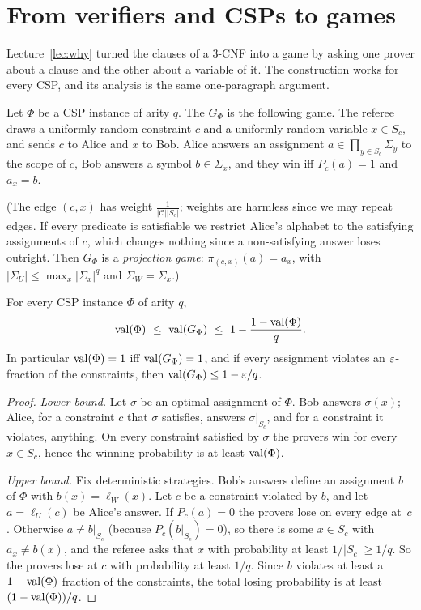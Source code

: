 \section{From verifiers and CSPs to games}
\label{sec:cv}

Lecture~\ref{lec:why} turned the clauses of a $3$-CNF into a game by asking one prover about a clause and the other
about a variable of it.  The construction works for every CSP, and its analysis is the same one-paragraph argument.

\begin{definition}\label{def:cvgame}
Let $\Phi$ be a CSP instance of arity $q$.  The  $G_\Phi$ is the following game.  The referee draws a
uniformly random constraint $c$ and a uniformly random variable $x\in S_c$, and sends $c$ to Alice and $x$ to Bob.  Alice
answers an assignment $a\in\prod_{y\in S_c}\Sigma_y$ to the scope of $c$, Bob answers a symbol $b\in\Sigma_x$, and they win iff
$P_c(a)=1$ and $a_x=b$.
\end{definition}

\noindent
(The edge $(c,x)$ has weight $\tfrac1{|\mathcal C||S_c|}$; weights are harmless since we may repeat edges.  If every predicate is satisfiable we restrict
Alice's alphabet to the satisfying assignments of $c$, which changes nothing since a non-satisfying answer loses outright.  Then $G_\Phi$ is a \emph{projection game}:
$\pi_{(c,x)}(a)=a_x$, with $|\Sigma_U|\le\max_x|\Sigma_x|^q$ and $\Sigma_W=\Sigma_x$.)

\begin{theorem}\label{thm:cv}
For every CSP instance $\Phi$ of arity $q$,
\[
  \val(\Phi)\ \le\ \val(G_\Phi)\ \le\ 1-\frac{1-\val(\Phi)}{q}.
\]
In particular $\operatorname{val}(\Phi)=1$ iff $\operatorname{val}(G_\Phi)=1$, and if every assignment violates an $\varepsilon$-fraction of the constraints, then
$\operatorname{val}(G_\Phi)\le1-\varepsilon/q$.
\end{theorem}
\begin{proof}
\emph{Lower bound.}  Let $\sigma$ be an optimal assignment of $\Phi$.  Bob answers $\sigma(x)$; Alice, for a constraint $c$ that $\sigma$
satisfies, answers $\sigma|_{S_c}$, and for a constraint it violates, anything.  On every constraint satisfied by $\sigma$ the provers win
for every $x\in S_c$, hence the winning probability is at least $\operatorname{val}(\Phi)$.

\emph{Upper bound.}  Fix deterministic strategies.  Bob's answers define an assignment $b$ of $\Phi$ with $b(x)=\ell_W(x)$.
Let $c$ be a constraint violated by $b$, and let $a=\ell_U(c)$ be Alice's answer.  If $P_c(a)=0$ the provers lose on every
edge at~$c$.  Otherwise $a\ne b|_{S_c}$ (because $P_c(b|_{S_c})=0$), so there is some $x\in S_c$ with $a_x\ne b(x)$, and the referee
asks that $x$ with probability at least $1/|S_c|\ge1/q$.  So the provers lose at $c$ with probability at least $1/q$.  Since $b$ violates at
least a $1-\operatorname{val}(\Phi)$ fraction of the constraints, the total losing probability is at least $(1-\operatorname{val}(\Phi))/q$.
\end{proof}

